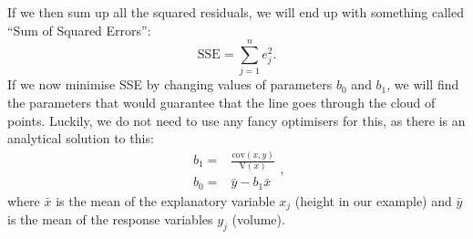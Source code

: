 \documentclass[
]{book}
\theoremstyle{definition}
\theoremstyle{definition}
\theoremstyle{definition}
\theoremstyle{definition}
\theoremstyle{remark}
\begin{document}
If we then sum up all the squared residuals, we will end up with something called ``Sum of Squared Errors'':
\begin{equation}
    \mathrm{SSE} = \sum_{j=1}^n e_j^2 .
    \label{eq:OLSCriterion}
\end{equation}
If we now minimise SSE by changing values of parameters \({b}_0\) and \({b}_1\), we will find the parameters that would guarantee that the line goes through the cloud of points. Luckily, we do not need to use any fancy optimisers for this, as there is an analytical solution to this:
\begin{equation}
    \begin{aligned}
        {b}_1 = & \frac{\mathrm{cov}(x,y)}{\mathrm{V}(x)} \\
        {b}_0 = & \bar{y} - {b}_1 \bar{x}
    \end{aligned} ,
    \label{eq:OLSSLREstimates}
\end{equation}
where \(\bar{x}\) is the mean of the explanatory variable \(x_j\) (height in our example) and \(\bar{y}\) is the mean of the response variables \(y_j\) (volume).
\end{document}
